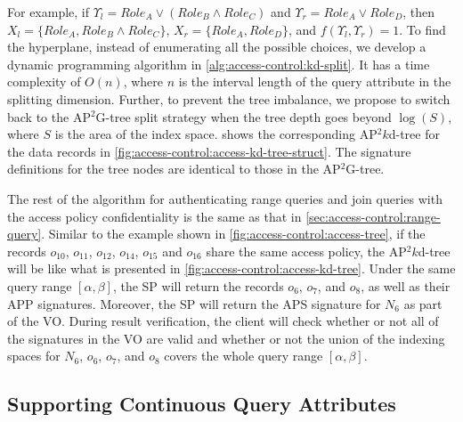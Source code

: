 For example, if $\Upsilon_l = {Role}_{A} \lor ({Role}_{B} \land {Role}_{C})$ and $\Upsilon_r = {Role}_{A} \lor {Role}_{D}$, then $X_l = \{ {Role}_{A}, {Role}_{B} \land {Role}_{C} \}$, $X_r = \{ {Role}_{A}, {Role}_{D} \}$, and $f(\Upsilon_l, \Upsilon_r) = 1$.
To find the hyperplane, instead of enumerating all the possible choices, we develop a dynamic programming algorithm in \cref{alg:access-control:kd-split}.
It has a time complexity of $O(n)$, where $n$ is the interval length of the query attribute in the splitting dimension.
Further, to prevent the tree imbalance, we propose to switch back to the AP$^2$G-tree split strategy when the tree depth goes beyond $\log(S)$, where $S$ is the area of the index space.
 shows the corresponding AP$^2k$d-tree for the data records in \cref{fig:access-control:access-kd-tree-struct}. The signature definitions for the tree nodes are identical to those in the AP$^2$G-tree.

The rest of the algorithm for authenticating range queries and join queries with the access policy confidentiality is the same as that in \cref{sec:access-control:range-query}.
Similar to the example shown in \cref{fig:access-control:access-tree}, if the records $o_{10}$, $o_{11}$, $o_{12}$, $o_{14}$, $o_{15}$ and $o_{16}$ share the same access policy, the AP$^2k$d-tree will be like what is presented in \cref{fig:access-control:access-kd-tree}. Under the same query range $[\alpha, \beta]$, the SP will return the records $o_6$, $o_7$, and $o_8$, as well as their APP signatures. Moreover, the SP will return the APS signature for $N_6$ as part of the VO\@. During result verification, the client will check whether or not all of the signatures in the VO are valid and whether or not the union of the indexing spaces for $N_6$, $o_6$, $o_7$, and $o_8$ covers the whole query range $[\alpha,\beta]$.

\subsection{Supporting Continuous Query Attributes}\label{sec:access-control:continuous-attribute}

